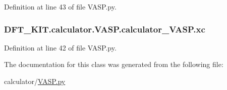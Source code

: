 Definition at line 43 of file V\+A\+S\+P.\+py.

\hypertarget{class_d_f_t___k_i_t_1_1calculator_1_1_v_a_s_p_1_1calculator___v_a_s_p_a25c8211618e29623de65dc025b7095ff}{
\subsubsection[{xc}]{\setlength{\rightskip}{0pt plus 5cm}D\+F\+T\+\_\+\+K\+I\+T.\+calculator.\+V\+A\+S\+P.\+calculator\+\_\+\+V\+A\+S\+P.\+xc}}\label{class_d_f_t___k_i_t_1_1calculator_1_1_v_a_s_p_1_1calculator___v_a_s_p_a25c8211618e29623de65dc025b7095ff}


Definition at line 42 of file V\+A\+S\+P.\+py.



The documentation for this class was generated from the following file\+:\begin{DoxyCompactItemize}
\item 
calculator/\hyperlink{_v_a_s_p_8py}{V\+A\+S\+P.\+py}\end{DoxyCompactItemize}
